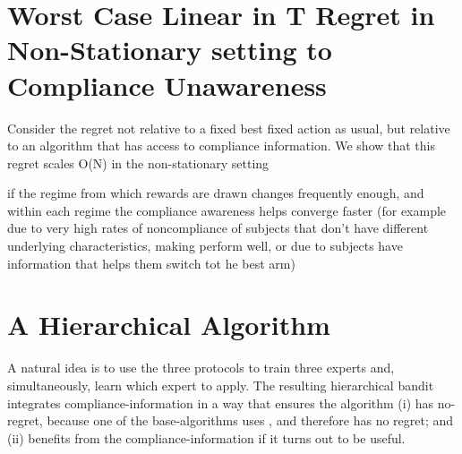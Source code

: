 



\section{Worst Case Linear in T Regret in Non-Stationary setting to Compliance Unawareness}

Consider the regret not relative to a fixed best fixed action as usual, but relative to an algorithm that has access to compliance information. We show that this regret scales O(N) in the non-stationary setting 

if the regime from which rewards are drawn changes frequently enough, and within each regime the compliance awareness helps converge faster (for example due to very high rates of noncompliance of subjects that don't have different underlying characteristics, making \actual perform well, or due to subjects have information that helps them switch tot he best arm) 


\section{A Hierarchical Algorithm}

A natural idea is to use the three protocols to train three experts and, simultaneously, learn which expert to apply. The resulting hierarchical bandit integrates compliance-information in a way that ensures the algorithm (i) has no-regret, because one of the base-algorithms uses \chosen, and therefore has no regret; and (ii) benefits from the compliance-information if it turns out to be useful.

